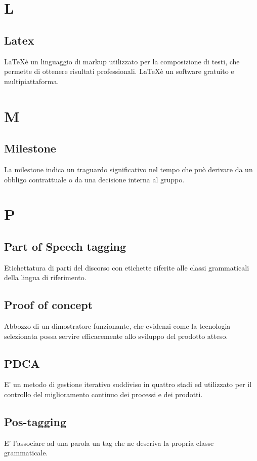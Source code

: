 	\section{L}
	\subsection{Latex} 
	\LaTeX è un linguaggio di markup utilizzato per la composizione di testi, che permette di ottenere risultati professionali. \LaTeX è un software gratuito e multipiattaforma.

	\section{M}
	\subsection{Milestone} 
	La milestone indica un traguardo significativo nel tempo che può derivare da un obbligo contrattuale o da una decisione interna al gruppo.

	\section{P}
	\subsection{Part of Speech tagging}
	Etichettatura di parti del discorso con etichette riferite alle classi grammaticali della lingua di riferimento.
	\subsection{Proof of concept}
	Abbozzo di un dimostratore funzionante, che evidenzi come la tecnologia selezionata possa servire efficacemente allo sviluppo del prodotto atteso.
	
	\subsection{PDCA}
	E' un metodo di gestione iterativo suddiviso in quattro stadi ed utilizzato per il controllo del miglioramento continuo dei processi e dei prodotti.
	
	\subsection{Pos-tagging}
	E' l'associare ad una parola un tag che ne descriva la propria classe grammaticale.
	
